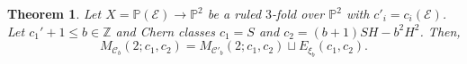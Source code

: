 \documentclass[11pt,twoside]{amsart}
\newtheorem{theorem}{Theorem}[section]
\theoremstyle{definition}
\newcommand {\Closure}{\mathrm{Closure}}
\newcommand{\Num}{\operatorname{Num}}
\begin{document}
\begin{theorem}
\label{prop_decom} Let $X=\mathbb{P}(\mathcal{E})\rightarrow\mathbb{P}^2$ be a ruled $3$-fold over $\mathbb{P}^2$ with $c'_i=c_i(\mathcal{E})$.  Let  $c_1'+1\leq b\in\mathbb{Z}$ and Chern classes $c_1=S$ and $c_2=(b+1)SH-b^2H^2$.
   Then, $$M_{\mathcal{C}_b}(2;c_1,c_2)=M_{\mathcal{C}'_b}(2;c_1,c_2)\sqcup E_{\xi_b}(c_1,c_2).$$ 
\end{theorem}
\end{document}
